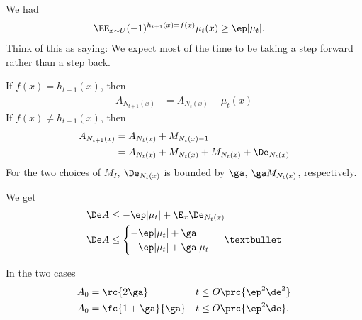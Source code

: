 We had
\begin{align}
\EE_{x\sim U} (-1)^{h_{t+1}(x) = f(x)} \mu_t(x) &\ge \ep|\mu_t|.
\end{align}
Think of this as saying: We expect most of the time to be taking a step forward rather than a step back.

If $f(x)=h_{t+1}(x)$, then 
\begin{align}
A_{N_{t+1}(x)}& = A_{N_t(x)}-\mu_t(x)
\end{align}
If $f(x) \ne h_{t+1}(x)$, then
\begin{align}
A_{N_{t+1}(x)}& = A_{N_t(x)} + M_{N_t(x)-1}\\
&= A_{N_t(x)} + M_{N_t(x)} + M_{N_t(x)} + \De_{N_t(x)}
\end{align}
For the two choices of $M_I$, $\De_{N_t(x)}$ is bounded by $\ga$, $\ga M_{N_t(x)}$, respectively.

We get
\begin{align}
\De A &\le -\ep |\mu_t| + \E_x \De_{N_t(x)}\\
\De A &\le \begin{cases}
-\ep |\mu_t| + \ga\\
-\ep |\mu_t| + \ga |\mu_t|
\end{cases}•
\end{align}

In the two cases
\begin{align}
A_0&=\rc{2\ga}& t&\le O\prc{\ep^2\de^2}\\
A_0&=\fc{1+\ga}{\ga}& t&\le O\prc{\ep^2\de}.
\end{align}

